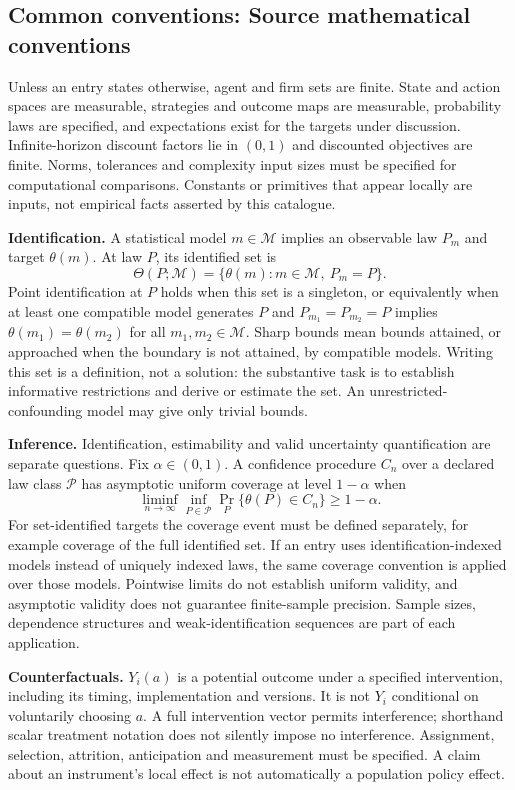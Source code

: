 \documentclass[11pt,a4paper]{article}
\begin{document}
\subsection*{Common conventions: Source mathematical conventions}

Unless an entry states otherwise, agent and firm sets are finite. State and action spaces are measurable, strategies and outcome maps are measurable, probability laws are specified, and expectations exist for the targets under discussion. Infinite-horizon discount factors lie in $(0,1)$ and discounted objectives are finite. Norms, tolerances and complexity input sizes must be specified for computational comparisons. Constants or primitives that appear locally are inputs, not empirical facts asserted by this catalogue.

\textbf{Identification.} A statistical model $m\in\mathcal M$ implies an observable law $P_m$ and target $\theta(m)$. At law $P$, its identified set is
\[
\Theta(P;\mathcal M)=\{\theta(m):m\in\mathcal M,\ P_m=P\}.
\]
Point identification at $P$ holds when this set is a singleton, or equivalently when at least one compatible model generates $P$ and $P_{m_1}=P_{m_2}=P$ implies $\theta(m_1)=\theta(m_2)$ for all $m_1,m_2\in\mathcal M$. Sharp bounds mean bounds attained, or approached when the boundary is not attained, by compatible models. Writing this set is a definition, not a solution: the substantive task is to establish informative restrictions and derive or estimate the set. An unrestricted-confounding model may give only trivial bounds.

\textbf{Inference.} Identification, estimability and valid uncertainty quantification are separate questions. Fix $\alpha\in(0,1)$. A confidence procedure $C_n$ over a declared law class $\mathcal P$ has asymptotic uniform coverage at level $1-\alpha$ when
\[
\liminf_{n\to\infty}\inf_{P\in\mathcal P}\Pr_P\{\theta(P)\in C_n\}\geq1-\alpha.
\]
For set-identified targets the coverage event must be defined separately, for example coverage of the full identified set. If an entry uses identification-indexed models instead of uniquely indexed laws, the same coverage convention is applied over those models. Pointwise limits do not establish uniform validity, and asymptotic validity does not guarantee finite-sample precision. Sample sizes, dependence structures and weak-identification sequences are part of each application.

\textbf{Counterfactuals.} $Y_i(a)$ is a potential outcome under a specified intervention, including its timing, implementation and versions. It is not $Y_i$ conditional on voluntarily choosing $a$. A full intervention vector permits interference; shorthand scalar treatment notation does not silently impose no interference. Assignment, selection, attrition, anticipation and measurement must be specified. A claim about an instrument's local effect is not automatically a population policy effect.
\end{document}
